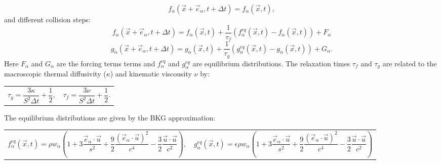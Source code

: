 \documentclass{article}
\begin{document}
\begin{equation}
	f_{\alpha}(\vec{x} + \vec{e}_\alpha, t + \Delta t) = f_{\alpha}(\vec{x}, t),
	\label{streaming step}
\end{equation}
and different collision steps:
\begin{equation}
	f_{\alpha}(\vec{x} + \vec{e}_{\alpha}, t + \Delta t) = f_{\alpha}(\vec{x}, t) + \frac{1}{\tau_f} (f^{eq}_{\alpha}(\vec{x}, t)  - f_{\alpha}(\vec{x}, t)) + F_{\alpha}
	\label{f collision step}
\end{equation}
\begin{equation}
	g_{\alpha}(\vec{x} + \vec{e}_{\alpha}, t + \Delta t) = g_{\alpha}(\vec{x}, t) + \frac{1}{\tau_g} (g^{eq}_{\alpha}(\vec{x}, t)  - g_{\alpha}(\vec{x}, t)) + G_{\alpha}.
	\label{g collision step}
\end{equation}
Here $F_{\alpha}$ and $G_{\alpha}$ are the forcing terms terms and $f^{eq}_{\alpha}$ and $g^{eq}_{\alpha}$ are equilibrium distributions. The relaxation times $\tau_f$ and $\tau_g$ are related to the macroscopic thermal diffusivity ($\kappa$) and kinematic viscousity $\nu$ by:


\begin{tabularx}{\textwidth}{XX}
\begin{equation}
	\tau_g = \frac{3 \kappa}{S^2 \Delta t} + \frac{1}{2},
\end{equation}
    &
\begin{equation}
	\tau_f = \frac{3 \nu}{S^2 \Delta t} + \frac{1}{2}.
\end{equation}
\end{tabularx}\par
The equilibrium distributions are given by the BKG approximation:

\begin{tabularx}{\textwidth}{XX}
\begin{equation}
	f^{eq}_{\alpha}(\vec{x}, t)  = \rho w_{\alpha} (1 + 3 \frac{\vec{e}_{\alpha} \cdot \vec{u}}{s^2} + \frac{9}{2} \frac{(\vec{e}_{\alpha} \cdot \vec{u}  )^2}{c^4} - \frac{3}{2} \frac{\vec{u} \cdot \vec{u}}{c^2}  ),
\end{equation}
    &
\begin{equation}
	g^{eq}_{\alpha}(\vec{x}, t)  = \epsilon \rho w_{\alpha} (1 + 3 \frac{\vec{e}_{\alpha} \cdot \vec{u}}{s^2} + \frac{9}{2} \frac{(\vec{e}_{\alpha} \cdot \vec{u}  )^2}{c^4} - \frac{3}{2} \frac{\vec{u} \cdot \vec{u}}{c^2}  )
\end{equation}
\end{tabularx}\par
\end{document}
